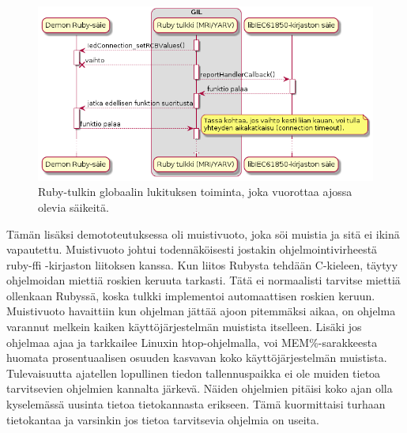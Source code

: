\begin{figure}
	\includegraphics[width=1\textwidth]{pictures/ruby-gil.png}
	\caption{Ruby-tulkin globaalin lukituksen toiminta, joka vuorottaa ajossa olevia säikeitä.}
	\label{fig:ruby-gil}
\end{figure}

Tämän lisäksi demototeutuksessa oli muistivuoto, joka söi muistia ja sitä ei ikinä vapautettu. Muistivuoto johtui todennäköisesti jostakin ohjelmointivirheestä ruby-ffi -kirjaston liitoksen kanssa. Kun liitos Rubysta tehdään C-kieleen, täytyy ohjelmoidan miettiä roskien keruuta tarkasti. Tätä ei normaalisti tarvitse miettiä ollenkaan Rubyssä, koska tulkki implementoi automaattisen roskien keruun. Muistivuoto havaittiin kun ohjelman jättää ajoon pitemmäksi aikaa, on ohjelma varannut melkein kaiken käyttöjärjestelmän muistista itselleen. Lisäki jos ohjelmaa ajaa ja tarkkailee Linuxin htop-ohjelmalla, voi MEM\%-sarakkeesta huomata prosentuaalisen osuuden kasvavan koko käyttöjärjestelmän muistista. Tulevaisuutta ajatellen lopullinen tiedon tallennuspaikka ei ole muiden tietoa tarvitsevien ohjelmien kannalta järkevä. Näiden ohjelmien pitäisi koko ajan olla kyselemässä uusinta tietoa tietokannasta erikseen. Tämä kuormittaisi turhaan tietokantaa ja varsinkin jos tietoa tarvitsevia ohjelmia on useita.